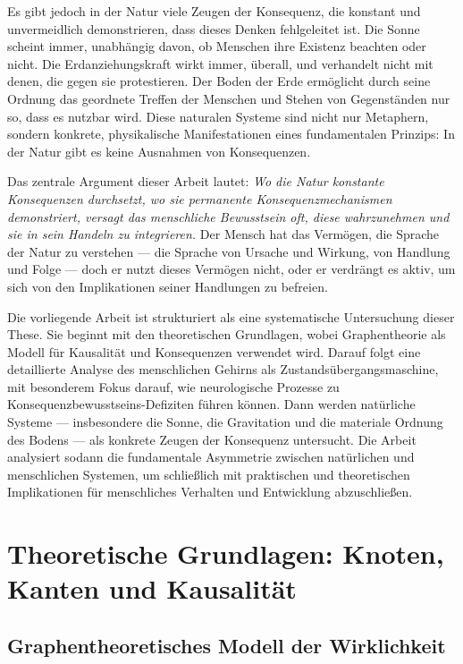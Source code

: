 \documentclass[12pt,a4paper]{article}
\begin{document}
Es gibt jedoch in der Natur viele Zeugen der Konsequenz, die konstant und unvermeidlich demonstrieren, dass dieses Denken fehlgeleitet ist. Die Sonne scheint immer, unabhängig davon, ob Menschen ihre Existenz beachten oder nicht. Die Erdanziehungskraft wirkt immer, überall, und verhandelt nicht mit denen, die gegen sie protestieren. Der Boden der Erde ermöglicht durch seine Ordnung das geordnete Treffen der Menschen und Stehen von Gegenständen nur so, dass es nutzbar wird. Diese naturalen Systeme sind nicht nur Metaphern, sondern konkrete, physikalische Manifestationen eines fundamentalen Prinzips: In der Natur gibt es keine Ausnahmen von Konsequenzen.

Das zentrale Argument dieser Arbeit lautet: \textit{Wo die Natur konstante Konsequenzen durchsetzt, wo sie permanente Konsequenzmechanismen demonstriert, versagt das menschliche Bewusstsein oft, diese wahrzunehmen und sie in sein Handeln zu integrieren.} Der Mensch hat das Vermögen, die Sprache der Natur zu verstehen — die Sprache von Ursache und Wirkung, von Handlung und Folge — doch er nutzt dieses Vermögen nicht, oder er verdrängt es aktiv, um sich von den Implikationen seiner Handlungen zu befreien.

Die vorliegende Arbeit ist strukturiert als eine systematische Untersuchung dieser These. Sie beginnt mit den theoretischen Grundlagen, wobei Graphentheorie als Modell für Kausalität und Konsequenzen verwendet wird. Darauf folgt eine detaillierte Analyse des menschlichen Gehirns als Zustandsübergangsmaschine, mit besonderem Fokus darauf, wie neurologische Prozesse zu Konsequenzbewusstseins-Defiziten führen können. Dann werden natürliche Systeme — insbesondere die Sonne, die Gravitation und die materiale Ordnung des Bodens — als konkrete Zeugen der Konsequenz untersucht. Die Arbeit analysiert sodann die fundamentale Asymmetrie zwischen natürlichen und menschlichen Systemen, um schließlich mit praktischen und theoretischen Implikationen für menschliches Verhalten und Entwicklung abzuschließen.

\section{Theoretische Grundlagen: Knoten, Kanten und Kausalität}

\subsection{Graphentheoretisches Modell der Wirklichkeit}
\end{document}
